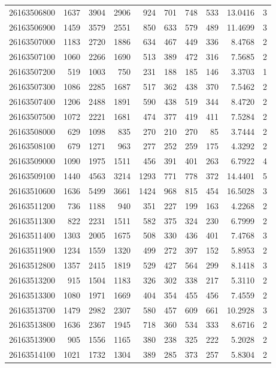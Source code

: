 \documentclass[
  11pt,
]{article}
\begin{document}
\begin{longtable}[t]{lrrrrrrrrr}
26163506800 & 1637 & 3904 & 2906 & 924 & 701 & 748 & 533 & 13.0416 & 3\\
26163506900 & 1459 & 3579 & 2551 & 850 & 633 & 579 & 489 & 11.4699 & 3\\
26163507000 & 1183 & 2720 & 1886 & 634 & 467 & 449 & 336 & 8.4768 & 2\\
26163507100 & 1060 & 2266 & 1690 & 513 & 389 & 472 & 316 & 7.5685 & 2\\
26163507200 & 519 & 1003 & 750 & 231 & 188 & 185 & 146 & 3.3703 & 1\\
26163507300 & 1086 & 2285 & 1687 & 517 & 362 & 438 & 370 & 7.5462 & 2\\
26163507400 & 1206 & 2488 & 1891 & 590 & 438 & 519 & 344 & 8.4720 & 2\\
26163507500 & 1072 & 2221 & 1681 & 474 & 377 & 419 & 411 & 7.5284 & 2\\
26163508000 & 629 & 1098 & 835 & 270 & 210 & 270 & 85 & 3.7444 & 2\\
26163508100 & 679 & 1271 & 963 & 277 & 252 & 259 & 175 & 4.3292 & 2\\
26163509000 & 1090 & 1975 & 1511 & 456 & 391 & 401 & 263 & 6.7922 & 4\\
26163509100 & 1440 & 4563 & 3214 & 1293 & 771 & 778 & 372 & 14.4401 & 5\\
26163510600 & 1636 & 5499 & 3661 & 1424 & 968 & 815 & 454 & 16.5028 & 3\\
26163511200 & 736 & 1188 & 940 & 351 & 227 & 199 & 163 & 4.2268 & 2\\
26163511300 & 822 & 2231 & 1511 & 582 & 375 & 324 & 230 & 6.7999 & 2\\
26163511400 & 1303 & 2005 & 1675 & 508 & 330 & 436 & 401 & 7.4768 & 3\\
26163511900 & 1234 & 1559 & 1320 & 499 & 272 & 397 & 152 & 5.8953 & 2\\
26163512800 & 1357 & 2415 & 1819 & 529 & 427 & 564 & 299 & 8.1418 & 3\\
26163513200 & 915 & 1504 & 1183 & 326 & 302 & 338 & 217 & 5.3110 & 2\\
26163513300 & 1080 & 1971 & 1669 & 404 & 354 & 455 & 456 & 7.4559 & 2\\
26163513700 & 1479 & 2982 & 2307 & 580 & 457 & 609 & 661 & 10.2928 & 3\\
26163513800 & 1636 & 2367 & 1945 & 718 & 360 & 534 & 333 & 8.6716 & 2\\
26163513900 & 905 & 1556 & 1165 & 380 & 238 & 325 & 222 & 5.2028 & 2\\
26163514100 & 1021 & 1732 & 1304 & 389 & 285 & 373 & 257 & 5.8304 & 2\\

\end{longtable}
\end{document}
